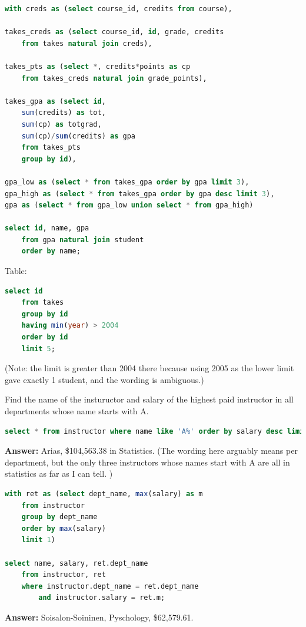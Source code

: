 \documentclass[11pt, oneside]{amsart}   	%
\begin{document}
\begin{lstlisting}[language=SQL]
    with creds as (select course_id, credits from course),

takes_creds as (select course_id, id, grade, credits 
    from takes natural join creds), 

takes_pts as (select *, credits*points as cp 
    from takes_creds natural join grade_points),

takes_gpa as (select id, 
    sum(credits) as tot, 
    sum(cp) as totgrad, 
    sum(cp)/sum(credits) as gpa 
    from takes_pts 
    group by id), 

gpa_low as (select * from takes_gpa order by gpa limit 3), 
gpa_high as (select * from takes_gpa order by gpa desc limit 3), 
gpa as (select * from gpa_low union select * from gpa_high)

select id, name, gpa
    from gpa natural join student
    order by name;
\end{lstlisting}

Table: 

\begin{lstlisting}[language=SQL]
    select id
    from takes 
    group by id
    having min(year) > 2004
    order by id
    limit 5;
\end{lstlisting}
(Note: the limit is greater than 2004 there because using 2005 as the lower limit gave exactly 1 student, and the wording is ambiguous.)


Find the name of the instuructor and salary of the highest paid instructor in all departments whose name starts with A.
\begin{lstlisting}[language=SQL]
    select * from instructor where name like 'A%' order by salary desc limit 1;
\end{lstlisting}

\textbf{Answer: } Arias, \$104,563.38 in Statistics. (The wording here arguably means per department, but the only three instructors whose names start with A are all in statistics as far as I can tell. )

\begin{lstlisting}[language=SQL]
with ret as (select dept_name, max(salary) as m 
    from instructor 
    group by dept_name 
    order by max(salary)
    limit 1)

select name, salary, ret.dept_name 
    from instructor, ret 
    where instructor.dept_name = ret.dept_name 
        and instructor.salary = ret.m;
\end{lstlisting}
\textbf{Answer: } Soisalon-Soininen, Pyschology, \$62,579.61.
\end{document}
